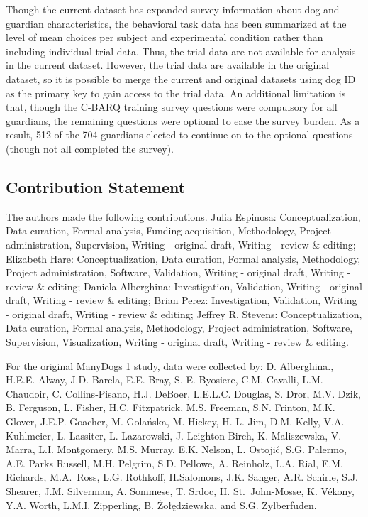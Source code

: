 \documentclass[
  man,floatsintext]{apa6}
\begin{document}
Though the current dataset has expanded survey information about dog and guardian characteristics, the behavioral task data has been summarized at the level of mean choices per subject and experimental condition rather than including individual trial data. Thus, the trial data are not available for analysis in the current dataset. However, the trial data are available in the original dataset, so it is possible to merge the current and original datasets using dog ID as the primary key to gain access to the trial data. An additional limitation is that, though the C-BARQ training survey questions were compulsory for all guardians, the remaining questions were optional to ease the survey burden. As a result, 512 of the 704 guardians elected to continue on to the optional questions (though not all completed the survey).

\hypertarget{contribution-statement}{%
\subsection{Contribution Statement}\label{contribution-statement}}

The authors made the following contributions. Julia Espinosa: Conceptualization, Data curation, Formal analysis, Funding acquisition, Methodology, Project administration, Supervision, Writing - original draft, Writing - review \& editing; Elizabeth Hare: Conceptualization, Data curation, Formal analysis, Methodology, Project administration, Software, Validation, Writing - original draft, Writing - review \& editing; Daniela Alberghina: Investigation, Validation, Writing - original draft, Writing - review \& editing; Brian Perez: Investigation, Validation, Writing - original draft, Writing - review \& editing; Jeffrey R. Stevens: Conceptualization, Data curation, Formal analysis, Methodology, Project administration, Software, Supervision, Visualization, Writing - original draft, Writing - review \& editing.

For the original ManyDogs 1 study, data were collected by: D. Alberghina., H.E.E. Alway, J.D. Barela, E.E. Bray, S.-E. Byosiere, C.M. Cavalli, L.M. Chaudoir, C. Collins-Pisano, H.J. DeBoer, L.E.L.C. Douglas, S. Dror, M.V. Dzik, B. Ferguson, L. Fisher, H.C. Fitzpatrick, M.S. Freeman, S.N. Frinton, M.K. Glover, J.E.P. Goacher, M. Golańska, M.
Hickey, H.-L. Jim, D.M. Kelly, V.A. Kuhlmeier, L. Lassiter, L. Lazarowski, J. Leighton-Birch, K. Maliszewska, V. Marra, L.I. Montgomery, M.S. Murray, E.K. Nelson, L. Ostojić, S.G. Palermo, A.E. Parks Russell, M.H. Pelgrim, S.D. Pellowe, A. Reinholz, L.A. Rial, E.M. Richards, M.A.~Ross, L.G. Rothkoff, H.Salomons, J.K. Sanger, A.R. Schirle, S.J. Shearer, J.M. Silverman, A. Sommese, T. Srdoc, H. St.~John-Mosse, K. Vékony, Y.A. Worth, L.M.I. Zipperling, B. Żołędziewska, and S.G. Zylberfuden.
\end{document}
